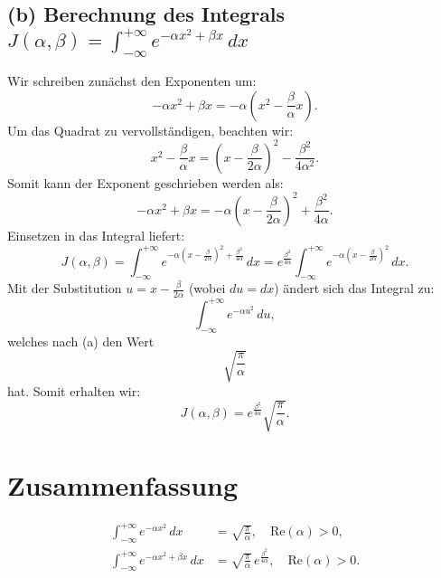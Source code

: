 \documentclass{article}
\begin{document}
\subsection*{(b) Berechnung des Integrals \(\displaystyle J(\alpha,\beta)=\int_{-\infty}^{+\infty} e^{-\alpha x^2+\beta x}\,dx\)}

Wir schreiben zunächst den Exponenten um:
\[
-\alpha x^2+\beta x = -\alpha \left(x^2-\frac{\beta}{\alpha}x\right).
\]
Um das Quadrat zu vervollständigen, beachten wir:
\[
x^2-\frac{\beta}{\alpha}x = \left(x-\frac{\beta}{2\alpha}\right)^2 - \frac{\beta^2}{4\alpha^2}.
\]
Somit kann der Exponent geschrieben werden als:
\[
-\alpha x^2+\beta x = -\alpha \left(x-\frac{\beta}{2\alpha}\right)^2 + \frac{\beta^2}{4\alpha}.
\]
Einsetzen in das Integral liefert:
\[
J(\alpha,\beta)= \int_{-\infty}^{+\infty} e^{-\alpha \left(x-\frac{\beta}{2\alpha}\right)^2 + \frac{\beta^2}{4\alpha}}\,dx 
= e^{\frac{\beta^2}{4\alpha}} \int_{-\infty}^{+\infty} e^{-\alpha \left(x-\frac{\beta}{2\alpha}\right)^2}\,dx.
\]
Mit der Substitution \( u = x-\frac{\beta}{2\alpha} \) (wobei \(du=dx\)) ändert sich das Integral zu:
\[
\int_{-\infty}^{+\infty} e^{-\alpha u^2}\,du,
\]
welches nach (a) den Wert
\[
\sqrt{\frac{\pi}{\alpha}}
\]
hat. Somit erhalten wir:
\[
J(\alpha,\beta)= e^{\frac{\beta^2}{4\alpha}} \sqrt{\frac{\pi}{\alpha}}.
\]

\bigskip

\section*{Zusammenfassung}

\[
\boxed{
\begin{aligned}
\int_{-\infty}^{+\infty} e^{-\alpha x^2}\,dx &= \sqrt{\frac{\pi}{\alpha}}, \quad \text{Re}(\alpha) > 0,\\[1mm]
\int_{-\infty}^{+\infty} e^{-\alpha x^2+\beta x}\,dx &= \sqrt{\frac{\pi}{\alpha}}\, e^{\frac{\beta^2}{4\alpha}}, \quad \text{Re}(\alpha) > 0.
\end{aligned}
}
\]
\end{document}
